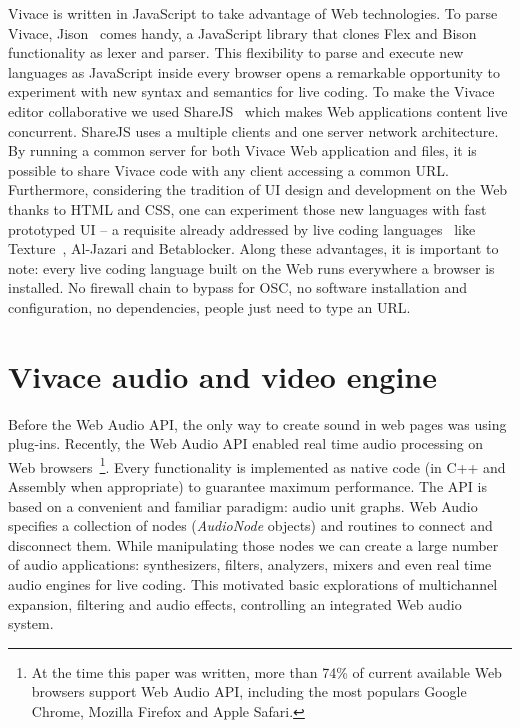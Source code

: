 \documentclass[12pt,times,twocolumn]{article}
\begin{document}
Vivace is written in JavaScript to take advantage of Web technologies.
To parse Vivace, Jison~\cite{jison} comes handy, a JavaScript
library that clones Flex and Bison functionality as lexer and
parser. This flexibility to parse and execute new languages as
JavaScript inside every browser opens a remarkable opportunity to
experiment with new syntax and semantics for live coding. To make the
Vivace editor collaborative we used ShareJS~\cite{sharejs} which makes
Web applications content live concurrent. ShareJS uses a multiple clients and
one server network architecture. By running a common server for both
Vivace Web application and files, it is possible
to share Vivace code with any client accessing a common
URL. Furthermore, considering the tradition of UI design and
development on the Web thanks to HTML and CSS, one can experiment
those new languages with fast prototyped UI -- a requisite already
addressed by live coding languages~\cite{mclean2010visualisation,
  magnusson2011algorithms} like Texture~\cite{mclean2011texture},
Al-Jazari and Betablocker. Along these advantages, it is important to
note: every live coding language built on the Web runs everywhere a
browser is installed. No firewall chain to bypass for OSC, no software
installation and configuration, no dependencies, people just need to
type an URL.

\section{Vivace audio and video engine}
Before the Web Audio API, the only way to create sound in web pages
was using plug-ins. Recently, the Web Audio API enabled real time
audio processing on Web browsers~\footnote{At the time this paper was
  written, more than 74\% of current available Web browsers support Web Audio
  API\cite{caniuse}, including the most populars Google Chrome, Mozilla Firefox and Apple
  Safari.}. Every functionality is implemented as native code (in C++
and Assembly when appropriate) to guarantee maximum performance. The
API is based on a convenient and familiar paradigm: audio unit
graphs. Web Audio specifies a collection of nodes (\emph{AudioNode}
objects) and routines to connect and disconnect them. While
manipulating those nodes we can create a large number of audio
applications: synthesizers, filters, analyzers, mixers and even real
time audio engines for live coding. This motivated basic explorations
of multichannel expansion, filtering and audio effects, controlling an
integrated Web audio system.
\end{document}
